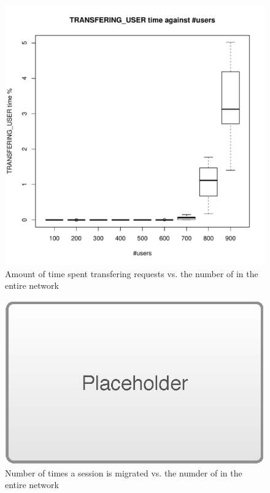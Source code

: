 \begin{figure}[tb]
	\centering
	\includegraphics[width=\linewidth]{TRANSFERING_USER.pdf} 
	\caption{Amount of time spent transfering requests vs. the number of \ues in the entire network}
	\label{fig:transfering}
\end{figure}

\begin{figure}[tb]
	\centering
	\includegraphics[width=\linewidth]{placeholder.eps} 
	\caption{Number of times a session is migrated vs. the numder of \ues in the entire network}
	\label{fig:session_migration}
\end{figure}

